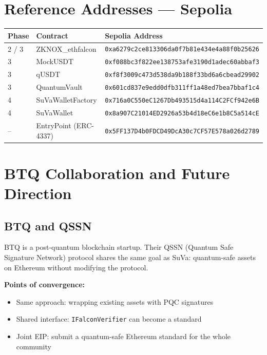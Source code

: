 \documentclass[11pt,a4paper]{article}
\begin{document}
\section{Reference Addresses --- Sepolia}

\begin{longtable}{@{}p{2cm}p{4cm}p{8cm}@{}}
\toprule
\textbf{Phase} & \textbf{Contract} & \textbf{Sepolia Address} \\
\midrule
\endhead
2 / 3 & ZKNOX\_ethfalcon & \texttt{0xa6279c2ce813306da0f7b81e434e4a88f0b25626} \\
3 & MockUSDT & \texttt{0xf088bc3f822ee138753afe3190d1adec60abbaf3} \\
3 & qUSDT & \texttt{0xf8f3009c473d538da9b188f33bd6a6cbead29902} \\
3 & QuantumVault & \texttt{0x601cd837e9edd0dfb311ff1a48ed7bea7bbaf1c4} \\
4 & SuVaWalletFactory & \texttt{0x716a0C550eC1267Db493515d4a114C2FCf942e6B} \\
4 & SuVaWallet & \texttt{0x8a907C21014ED2926a53b4d18eC6e1b8C5a514cE} \\
-- & EntryPoint (ERC-4337) & \texttt{0x5FF137D4b0FDCD49DcA30c7CF57E578a026d2789} \\
\bottomrule
\end{longtable}

\section{BTQ Collaboration and Future Direction}

\subsection{BTQ and QSSN}

BTQ is a post-quantum blockchain startup. Their QSSN (Quantum Safe Signature Network) protocol shares the same goal as SuVa: quantum-safe assets on Ethereum without modifying the protocol.

\textbf{Points of convergence:}
\begin{itemize}
  \item Same approach: wrapping existing assets with PQC signatures
  \item Shared interface: \texttt{IFalconVerifier} can become a standard
  \item Joint EIP: submit a quantum-safe Ethereum standard for the whole community
\end{itemize}
\end{document}
